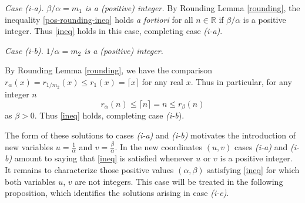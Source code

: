 \documentclass[12pt,letterpaper, reqno]{amsart}
\theoremstyle{definition}
\theoremstyle{remark}
\newcommand{\RR}{\ensuremath{\mathbb{R}}}
\newcommand{\ZZ}{\ensuremath{\mathbb{Z}}}
\newcommand{\ceil}[1]{\lceil{#1}\rceil}
\begin{document}
{\em Case {\it (i-a)}.} {\em ${\beta}/{\alpha}=m_1$ is a (positive)  integer.}
By Rounding Lemma \ref{rounding}, the inequality \eqref{pos-rounding-ineq}
 holds {\em a fortiori}  for all $n\in\RR$ if $\beta/\alpha$ is a positive integer. Thus \eqref{ineq} holds in this case, completing case {\it (i-a)}.
\smallskip
 

{\em Case {\it (i-b)}.} {\em ${1}/{\alpha}=m_2$ is a (positive)  integer.}\smallskip

By Rounding Lemma \ref{rounding}, we have the comparison $r_\alpha(x) = r_{1/m_2}(x) \leq r_1(x) = \ceil{x}$ for any real $x$. Thus in particular, for any integer $n$
\[ r_\alpha(n) \leq \ceil{n} = n \leq r_\beta(n) \]
as $\beta>0$. Thus \eqref{ineq} holds, completing case {\it(i-b}). \medskip

The form of these solutions to cases {\it (i-a)} and {\it (i-b)} 
 motivates the introduction of new variables  $u= \frac{1}{\alpha}$ and $v= \frac{\beta}{\alpha}.$
In the new coordinates $(u,v)$ cases {\it (i-a)} and {\it (i-b)} amount to saying that \eqref{ineq} is satisfied whenever $u$ or $v$ is a positive integer.
 It remains to characterize those positive values $(\alpha, \beta)$
satisfying \eqref{ineq} for which  both  variables $u$, $v$ are not integers.
This case will be treated in the following proposition, which identifies the solutions arising  in  
case {\it (i-c)}. 
\end{document}
